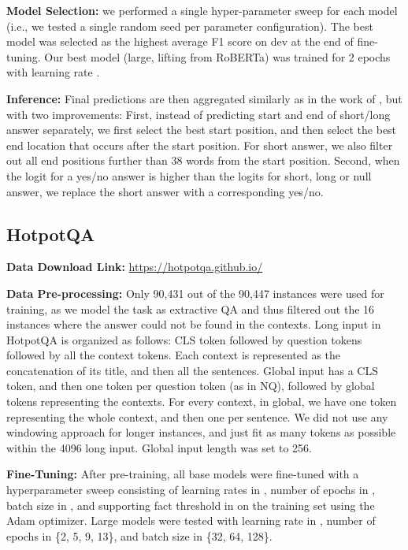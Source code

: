 \documentclass[11pt,a4paper]{article}
\begin{document}
{\bf Model Selection:} we performed a single hyper-parameter sweep for each model (i.e., we tested a single random seed per parameter configuration). The best model was selected as the highest average F1 score on dev at the end of fine-tuning. Our best model (large, lifting from RoBERTa) was trained for 2 epochs with learning rate .


{\bf Inference:} Final predictions are then aggregated similarly as in the work of \citet{alberti2019bert}, but with two improvements: First, instead of predicting start and end of short/long answer separately, we first select the best start position, and then select the best end location that occurs after the start position. For short answer, we also filter out all end positions further than 38 words from the start position. Second, when the logit for a yes/no answer is higher than the logits for short, long or null answer, we replace the short answer with a corresponding yes/no.


\subsection*{HotpotQA}

{\bf Data Download Link:} \url{https://hotpotqa.github.io/}


{\bf Data Pre-processing:}  Only 90,431 out of the 90,447 instances were used for training, as we model the task as extractive QA and thus filtered out the 16 instances where the answer could not be found in the contexts. Long input in HotpotQA is organized as follows: CLS token followed by question tokens followed by all the context tokens. Each context is represented as the concatenation of its title, and then all the sentences. Global input has a CLS token, and then one token per question token (as in NQ), followed by global tokens representing the contexts. For every context, in global, we have one token representing the whole context, and then one per sentence. We did not use any windowing approach for longer instances, and just fit as many tokens as possible within the 4096 long input. Global input length was set to 256. 

{\bf Fine-Tuning:} After pre-training, all base models were fine-tuned with a hyperparameter sweep consisting of learning rates in , number of epochs in , batch size in , and supporting fact threshold in  on the training set using the Adam optimizer. Large models were tested with learning rate in , number of epochs in \{2, 5, 9, 13\}, and batch size in \{32, 64, 128\}. 
\end{document}
